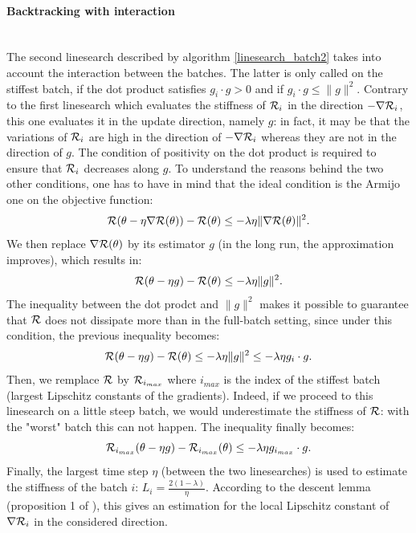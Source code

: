 \paragraph{Backtracking with interaction}
~~\\
The second linesearch described by algorithm \ref{linesearch_batch2} takes into account the interaction between the batches. The latter is only called on the stiffest batch, if the dot product satisfies $g_i \cdot g>0$ and if $g_i \cdot g \leq \|g\|^2$. Contrary to the first linesearch which evaluates the stiffness of $\mathcal{R}_i$ in the direction $-\nabla \mathcal{R}_i$, this one evaluates it in the update direction, namely $g$: in fact, it may be that the variations of $\mathcal{R}_i$ are high in the direction of $-\nabla \mathcal{R}_i$ whereas they are not in the direction of $g$. The condition of positivity on the dot product is required to ensure that $\mathcal{R}_i$ decreases along $g$. To understand the reasons behind the two other conditions, one has to have in mind that the ideal condition is the Armijo one on the objective function:
\begin{equation*}
	\mathcal{R}(\theta-\eta \nabla \mathcal{R}(\theta)) - \mathcal{R}(\theta) \leq -\lambda \eta \|\nabla \mathcal{R}(\theta)\|^2.
\end{equation*}
We then replace $\nabla \mathcal{R}(\theta)$ by its estimator $g$ (in the long run, the approximation improves), which results in:
\begin{equation}
	\mathcal{R}(\theta-\eta g) - \mathcal{R}(\theta) \leq -\lambda \eta \|g\|^2.
\end{equation}   
The inequality between the dot prodct and $\|g\|^2$ makes it possible to guarantee that $\mathcal{R}$ does not dissipate more than in the full-batch setting, since under this condition, the previous inequality becomes:
\begin{equation*}
	\mathcal{R}(\theta-\eta g) - \mathcal{R}(\theta) \leq -\lambda \eta \|g\|^2 \leq -\lambda \eta g_i\cdot g.
\end{equation*}
Then, we remplace $\mathcal{R}$ by $\mathcal{R}_{i_{max}}$ where $i_{max}$ is the index of the stiffest batch (largest Lipschitz constants of the gradients). Indeed, if we proceed to this linesearch on a little steep batch, we would underestimate the stiffness of $\mathcal{R}$: with the "worst" batch this can not happen. The inequality finally becomes:
\begin{equation*}
	\mathcal{R}_{i_{max}}(\theta-\eta g) - \mathcal{R}_{i_{max}}(\theta) \leq -\lambda \eta g_{i_{max}}\cdot g.
\end{equation*}
Finally, the largest time step $\eta$ (between the two linesearches) is used to estimate the stiffness of the batch $i$: $L_i=\frac{2(1-\lambda)}{\eta}$. According to the descent lemma (proposition 1 of \cite{Lyap_Theory_Bilel}), this gives an estimation for the local Lipschitz constant of $\nabla \mathcal{R}_i$ in the considered direction.

